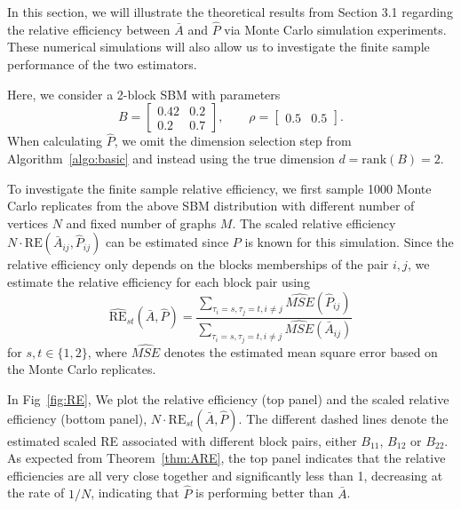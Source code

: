 \documentclass[10pt,letterpaper]{article}
\begin{document}
In this section, we will illustrate the theoretical results from Section 3.1 regarding the relative efficiency between $\bar{A}$ and $\hat{P}$ via Monte Carlo simulation experiments.
These numerical simulations will also allow us to investigate the finite sample performance of the two estimators.

Here, we consider a 2-block SBM with parameters
\begin{equation*}
B = \begin{bmatrix}
0.42 & 0.2 \\
0.2 & 0.7
\end{bmatrix}
,\qquad \rho = \begin{bmatrix}
0.5 & 0.5
\end{bmatrix}.
\end{equation*}
When calculating $\hat{P}$, we omit the dimension selection step from Algorithm~\ref{algo:basic} and instead using the true dimension $d = \mathrm{rank}(B) = 2$.

To investigate the finite sample relative efficiency, we first sample 1000 Monte Carlo replicates from the above SBM distribution with different number of vertices $N$ and fixed number of graphs $M$. The scaled relative efficiency $N \cdot \mathrm{RE}(\bar{A}_{ij}, \hat{P}_{ij})$ can be estimated since $P$ is known for this simulation. Since the relative efficiency only depends on the blocks memberships of the pair $i,j$, we estimate the relative efficiency for each block pair using
\[
    \hat{\mathrm{RE}}_{st}(\bar{A},\hat{P}) = \frac{\sum_{\tau_i=s,\tau_j=t,i \ne j} \widehat{MSE}(\hat{P}_{ij})}{\sum_{\tau_i=s,\tau_j=t,i \ne j} \widehat{MSE}(\bar{A}_{ij})}
\]
for $s,t\in\{1,2\}$, where $\hat{MSE}$ denotes the estimated mean square error based on the Monte Carlo replicates.

In Fig~\ref{fig:RE}, We plot the relative efficiency (top panel) and the scaled relative efficiency (bottom panel), $N \cdot \mathrm{RE}_{st}(\bar{A},\hat{P})$.
The different dashed lines denote the estimated scaled RE associated with different block pairs, either $B_{11}$, $B_{12}$ or $B_{22}$. 
As expected from Theorem~\ref{thm:ARE}, the top panel indicates that the relative efficiencies are all very close together and significantly less than 1, decreasing at the rate of $1/N$, indicating that $\hat{P}$ is performing better than $\bar{A}$.
\end{document}
